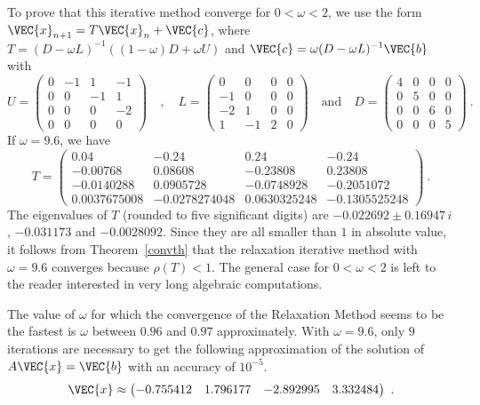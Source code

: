 {To prove that this iterative method converge for $0 < \omega < 2$, we
use the form $\VEC{x}_{n+1} = T\VEC{x}_n + \VEC{c}$, where
$\displaystyle T = (D-\omega L)^{-1}((1-\omega)D + \omega U)$ and 
$\displaystyle \VEC{c} = \omega (D-\omega L)^{-1}\VEC{b}$ with
\[
U = \begin{pmatrix} 0 & -1 & 1 & -1 \\ 0 & 0 & -1 & 1 \\
0 & 0 & 0 & -2 \\ 0 & 0 & 0 & 0 \end{pmatrix} \quad ,
\quad L = \begin{pmatrix} 0 & 0 & 0 & 0 \\ -1 & 0 & 0 & 0 \\
-2 & 1 & 0 & 0 \\ 1 & -1 & 2 & 0 \end{pmatrix}  \quad \text{and}
\quad D = \begin{pmatrix} 4 & 0 & 0 & 0 \\ 0 & 5 & 0 & 0 \\
  0 & 0 & 6 & 0 \\ 0 & 0 & 0 & 5 \end{pmatrix} \ .
\]
If $\omega = 9.6$, we have
\[
  T = \begin{pmatrix}
0.04 & -0.24 &  0.24 & -0.24 \\
-0.00768 &  0.08608 & -0.23808 & 0.23808 \\
-0.0140288 &  0.0905728 & -0.0748928 & -0.2051072 \\
0.0037675008 & -0.0278274048 &  0.0630325248 & -0.1305525248
\end{pmatrix} \ .
\]
The eigenvalues of $T$ (rounded to five significant digits) are 
$-0.022692 \pm 0.16947\,i$, $-0.031173$ and $-0.0028092$.  Since
they are all smaller than $1$ in absolute value, it follows from
Theorem~\ref{convth} that the relaxation iterative method with
$\omega = 9.6$ converges because $\rho(T) < 1$.  The general case for
$0 < \omega < 2$ is left to the reader interested in very long
algebraic computations.

The value of $\omega$ for which the convergence of the Relaxation
Method seems to be the fastest is $\omega$ between $0.96$ and $0.97$
approximately.  With $\omega=9.6$, only $9$ iterations are necessary
to get the following approximation of the solution of
$A\VEC{x} = \VEC{b}$ with an accuracy of $\displaystyle 10^{-5}$.
\[
\VEC{x} \approx \begin{pmatrix}
-0.755412 & 1.796177 & -2.892995 & 3.332484
\end{pmatrix} \ .
\]
}


